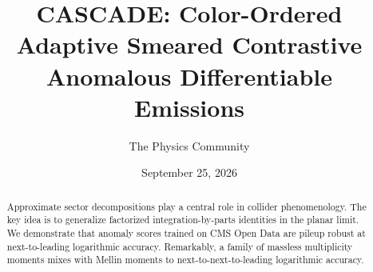 \documentclass[11pt]{article}
\title{CASCADE: Color-Ordered Adaptive Smeared Contrastive Anomalous Differentiable Emissions}
\author{The Physics Community}
\date{September 25, 2026}
\begin{document}
\maketitle
\begin{abstract}
Approximate sector decompositions play a central role in collider
phenomenology. The key idea is to generalize factorized
integration-by-parts identities in the planar limit. We demonstrate that
anomaly scores trained on CMS Open Data are pileup robust at
next-to-leading logarithmic accuracy. Remarkably, a family of massless
multiplicity moments mixes with Mellin moments to
next-to-next-to-leading logarithmic accuracy.
\end{abstract}
\tableofcontents






\nocite{*}


\end{document}
